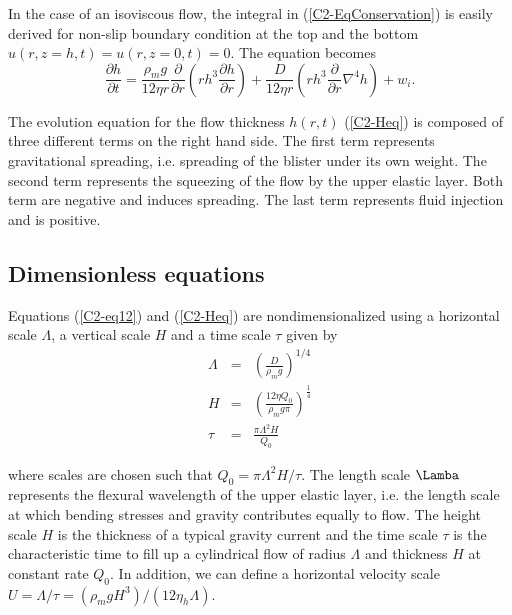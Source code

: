 In   the   case    of   an   isoviscous   flow,    the   integral   in
(\ref{C2-EqConservation})  is  easily  derived for  non-slip  boundary
condition  at the  top and  the bottom  $u(r,z=h,t)=u(r,z=0,t)=0$. The
equation becomes
\begin{equation}
  \frac{\partial h}{\partial t} =\frac{\rho_mg}{12 \eta r}
  \frac{\partial}{\partial r}  \left( rh^3  \frac{\partial h}{\partial
      r}\right)+\frac{D}{12\eta r} \left( rh^3 \frac{\partial}{\partial r}\nabla^4h\right)+
  w_i .\label{C2-Heq}
\end{equation}

The evolution equation for  the flow thickness $h(r,t)$ (\ref{C2-Heq})
is composed of three different terms on the right hand side. The first
term  represents  gravitational  spreading,  i.e.   spreading  of  the
blister under its own weight. The second term represents the squeezing
of the  flow by the upper  elastic layer.  Both term  are negative and
induces spreading.  The last  term represents  fluid injection  and is
positive.

\subsection{Dimensionless equations}
\label{sec:dimens-equat-1}

Equations  (\ref{C2-eq12}) and  (\ref{C2-Heq}) are  nondimensionalized
using a  horizontal scale $\Lambda$, a  vertical scale $H$ and  a time
scale $\tau$ given by
\begin{eqnarray}
  \Lambda &=& \left(\frac{D}{\rho_m g}\right)^{1/4}\label{L1}\\
  H&=&\left       (\frac{12\eta      Q_{0}}{\rho_{m}g       \pi}\right      )
       ^{\frac{1}{4}} \label{H1}\\
  \tau&=&\frac{\pi \Lambda^{2} H}{Q_{0}}\label{T1}
\end{eqnarray}

where scales  are chosen  such that $Q_0  = \pi\Lambda^2  H/\tau$. The
length scale $\Lamba$ represents the  flexural wavelength of the upper
elastic layer,  i.e. the  length scale at  which bending  stresses and
gravity  contributes equally  to flow.   The height  scale $H$  is the
thickness of  a typical gravity current  and the time scale  $\tau$ is
the  characteristic time  to  fill  up a  cylindrical  flow of  radius
$\Lambda$ and thickness  $H$ at constant rate $Q_0$.   In addition, we
can       define        a       horizontal        velocity       scale
$U=\Lambda/\tau=\left(\rho_m           g           H^3\right)/\left(12
  \eta_h\Lambda\right)$.

